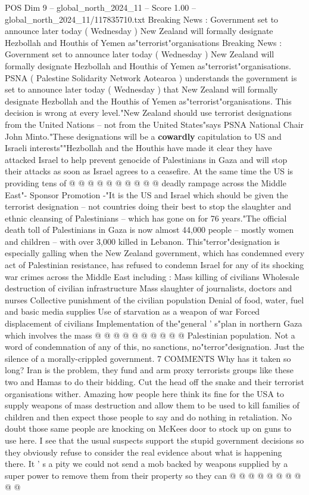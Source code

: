 \begin{textsample}{POS Dim 9 – global\_north\_2024\_11 – Score 1.00 – global\_north\_2024\_11/117835710.txt}  \label{ex:f9_pos_409}
Breaking News : Government set to announce later today ( Wednesday ) New Zealand will formally designate Hezbollah and Houthis of Yemen as"terrorist"organisations Breaking News : Government set to announce later today ( Wednesday ) New Zealand will formally designate Hezbollah and Houthis of Yemen as"terrorist"organisations.
PSNA ( Palestine Solidarity Network Aotearoa ) understands the government is set to announce later today ( Wednesday ) that New Zealand will formally designate Hezbollah and the Houthis of Yemen as"terrorist"organisations.
This decision is wrong at every level."New Zealand should use terrorist designations from the United Nations -- not from the United States"says PSNA National Chair John Minto."These designations will be a \textbf{cowardly} capitulation to US and Israeli interests""Hezbollah and the Houthis have made it clear they have attacked Israel to help prevent genocide of Palestinians in Gaza and will stop their attacks as soon as Israel agrees to a ceasefire.
At the same time the US is providing tens of @ @ @ @ @ @ @ @ @ @ deadly rampage across the Middle East"- Sponsor Promotion -"It is the US and Israel which should be given the terrorist designation -- not countries doing their best to stop the slaughter and ethnic cleansing of Palestinians -- which has gone on for 76 years."The official death toll of Palestinians in Gaza is now almost 44,000 people -- mostly women and children -- with over 3,000 killed in Lebanon.
This"terror"designation is especially galling when the New Zealand government, which has condemned every act of Palestinian resistance, has refused to condemn Israel for any of its shocking war crimes across the Middle East including : Mass killing of civilians Wholesale destruction of civilian infrastructure Mass slaughter of journalists, doctors and nurses Collective punishment of the civilian population Denial of food, water, fuel and basic media supplies Use of starvation as a weapon of war Forced displacement of civilians Implementation of the"general ' s"plan in northern Gaza which involves the mass @ @ @ @ @ @ @ @ @ @ Palestinian population.
Not a word of condemnation of any of this, no sanctions, no"terror"designation.
Just the silence of a morally-crippled government. 7 COMMENTS Why has it taken so long?
Iran is the problem, they fund and arm proxy terrorists groups like these two and Hamas to do their bidding.
Cut the head off the snake and their terrorist organisations wither.
Amazing how people here think its fine for the USA to supply weapons of mass destruction and allow them to be used to kill families of children and then expect those people to say and do nothing in retaliation.
No doubt those same people are knocking on McKees door to stock up on guns to use here.
I see that the usual suspects support the stupid government decisions so they obviously refuse to consider the real evidence about what is happening there.
It ' s a pity we could not send a mob backed by weapons supplied by a super power to remove them from their property so they can @ @ @ @ @ @ @ @ @ @

\end{textsample}
